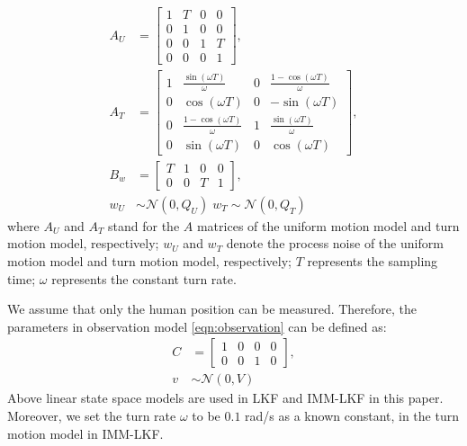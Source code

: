 \documentclass[letterpaper, 10 pt, conference]{ieeeconf}
\begin{document}
\begin{subequations}
\begin{align}
A_U&=\left[
\begin{array}{cccc}
1& T& 0& 0\\
0& 1& 0& 0\\
0& 0& 1& T\\
0& 0& 0& 1
\end{array}\right],\label{eqn:A_U}\\
A_T&=\left[
\begin{array}{cccc}
1& \frac{\sin(\omega T)}{\omega}& 0& \frac{1-\cos(\omega T)}{\omega}\\
0& \cos(\omega T)& 0& -\sin(\omega T)\\
0& \frac{1-\cos(\omega T)}{\omega}& 1& \frac{\sin(\omega T)}{\omega}\\
0& \sin(\omega T)& 0& \cos(\omega T)
\end{array}\right],\label{eqn:A_T}\\
B_w&=\left[
\begin{array}{cccc}
T& 1& 0& 0\\
0& 0& T& 1
\end{array}\right],\label{eqn:B_w}\\
w_U&\sim\mathcal{N}(0,Q_U)\; w_T\sim\mathcal{N}(0,Q_T)\label{eqn:pro_noise}
\end{align}
\end{subequations}
where $A_U$ and $A_T$ stand for the $A$ matrices of the uniform motion model and turn motion model, respectively; $w_U$ and $w_T$ denote the process noise of the uniform motion model and turn motion model, respectively; $T$ represents the sampling time; $\omega$ represents the constant turn rate.

We assume that only the human position can be measured.
Therefore, the parameters in observation model \cref{eqn:observation} can be defined as:
\begin{subequations}
\begin{align}
C&=\left[
\begin{array}{cccc}
1& 0& 0& 0\\
0& 0& 1& 0
\end{array}\right],\label{eqn:C}\\
v&\sim\mathcal{N}(0,V)\label{eqn:meas_noise}
\end{align}
\end{subequations}
Above linear state space models are used in LKF and IMM-LKF in this paper.
Moreover, we set the turn rate $\omega$ to be $0.1$ rad/s as a known constant, in the turn motion model in IMM-LKF. 
\end{document}

